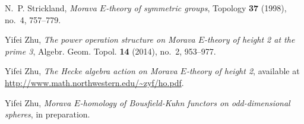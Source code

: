 \documentclass{gtpart}
\theoremstyle{definition}
\theoremstyle{remark}
\renewcommand{\=}{\approx}
\renewcommand{\-}{\sim}
\numberwithin{equation}{section}
\begin{document}
\begin{thebibliography}
N.~P. Strickland, \emph{Morava {$E$}-theory of symmetric groups}, Topology
  \textbf{37} (1998), no.~4, 757--779. 

Yifei Zhu, \emph{The power operation structure on {M}orava {$E$}-theory of
  height 2 at the prime 3}, Algebr. Geom. Topol. \textbf{14} (2014), no.~2,
  953--977. 

Yifei Zhu, \emph{The {H}ecke algebra action on {M}orava {$E$}-theory of height
  2}, available at \href{http://www.math.northwestern.edu/~zyf/ho.pdf}
  {http://www.math.northwestern.edu/\textasciitilde zyf/ho.pdf}.

Yifei Zhu, \emph{Morava $E$-homology of Bousfield-Kuhn functors on 
  odd-dimensional spheres}, in preparation.

\end{thebibliography}
\end{document}
